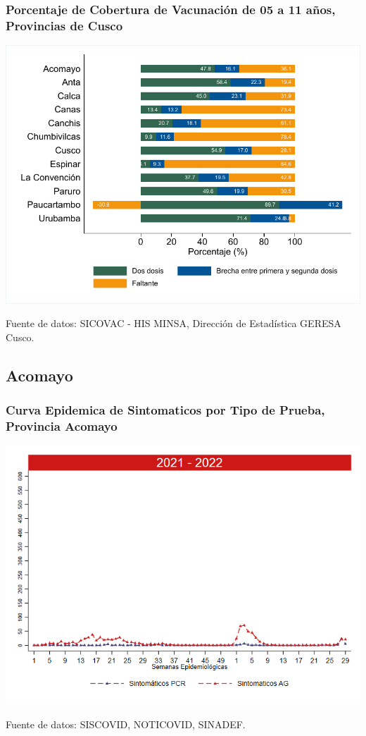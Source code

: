 \documentclass[xcolor=table]{beamer}
\begin{document}
\begin{frame}[label=vacunas_10]
	\frametitle{Porcentaje de Cobertura de Vacunación de 05 a 11 años, Provincias de Cusco}
	\vspace{-.5cm}
	\begin{center}
		\includegraphics[width=0.8\linewidth, trim={.2cm .5cm .2cm .2cm},clip]{../figuras/vacunacion_provincial_edad_1.pdf}
	\end{center}
	{\tiny Fuente de datos: SICOVAC - HIS MINSA, Dirección de Estadística GERESA Cusco. \\}
\hyperlink{cobertura_vacuna_provincias}{}
\end{frame}

\subsection{Acomayo}
\begin{frame}[label=Acomayo]
	\frametitle{Curva Epidemica de Sintomaticos por Tipo de Prueba, Provincia Acomayo}
	\vspace{-.5cm}
	\begin{center}
		\includegraphics[width=0.8\linewidth, trim={0cm .5cm 0cm 0.2cm},clip]{../figuras/sinto_prueba20_21_1.png}
	\end{center}
	{\tiny Fuente de datos: SISCOVID, NOTICOVID, SINADEF.}
	\hyperlink{TipoPrueba}{}
\end{frame}
\end{document}
